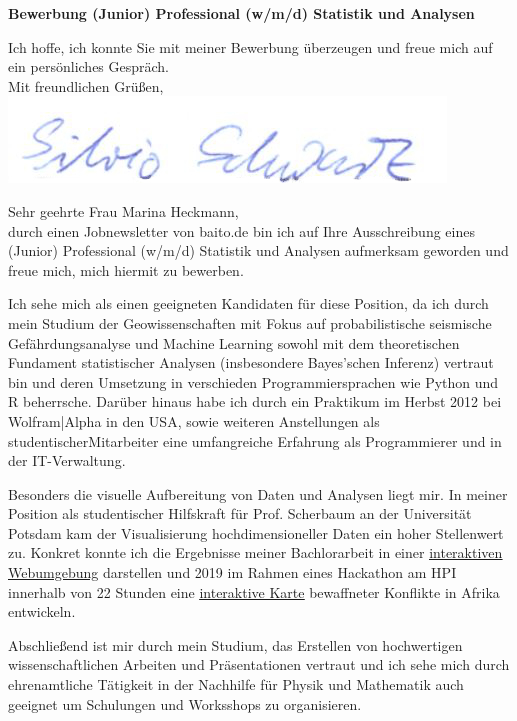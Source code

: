 \documentclass[11pt,a4paper,roman]{moderncv}
\begin{document}
\recipient{~}{ }
\date{\today}
\opening{\textbf{Bewerbung (Junior) Professional (w/m/d) Statistik und Analysen}}
\closing{Ich hoffe, ich konnte Sie mit meiner Bewerbung überzeugen und freue mich auf ein persönliches Gespräch.\\
\vspace{1cm}
Mit freundlichen Grüßen,\\ \vspace{0.2cm}
\includegraphics[scale=0.4]{../../img/Unterschrift_Silvio} \vspace{-1cm}
}
\makelettertitle

Sehr geehrte Frau Marina Heckmann,\\
durch einen Jobnewsletter von baito.de bin ich auf Ihre Ausschreibung eines (Junior) Professional (w/m/d) Statistik und Analysen aufmerksam geworden und freue mich, mich hiermit zu bewerben.

Ich sehe mich als einen geeigneten Kandidaten für diese Position, da ich durch mein Studium der Geowissenschaften mit Fokus auf probabilistische seismische Gefährdungsanalyse und Machine Learning sowohl mit dem theoretischen Fundament statistischer Analysen (insbesondere Bayes'schen Inferenz) vertraut bin und deren Umsetzung in verschieden Programmiersprachen wie Python und R beherrsche. Darüber hinaus habe ich durch ein Praktikum im Herbst 2012 bei Wolfram|Alpha in den USA, sowie weiteren Anstellungen als studentischerMitarbeiter eine umfangreiche Erfahrung als Programmierer und in der IT-Verwaltung.

Besonders die visuelle Aufbereitung von Daten und Analysen liegt mir. In meiner Position als studentischer Hilfskraft für Prof. Scherbaum an der Universität Potsdam kam der Visualisierung hochdimensioneller Daten ein hoher Stellenwert zu. Konkret konnte ich die Ergebnisse meiner Bachlorarbeit in einer \href{https://earthquake-distances.herokuapp.com/}{\color{pblue}\underline{interaktiven Webumgebung}} darstellen und 2019 im Rahmen eines Hackathon am HPI innerhalb von 22 Stunden eine \href{https://earthquake-distances.herokuapp.com}{\color{pblue}\underline{interaktive Karte}} bewaffneter Konflikte in Afrika entwickeln.

Abschließend ist mir durch mein Studium, das Erstellen von hochwertigen wissenschaftlichen Arbeiten und Präsentationen vertraut und ich sehe mich durch  ehrenamtliche Tätigkeit in der Nachhilfe für Physik und Mathematik auch geeignet um Schulungen und Worksshops zu organisieren.\\


\makeletterclosing
\end{document}

